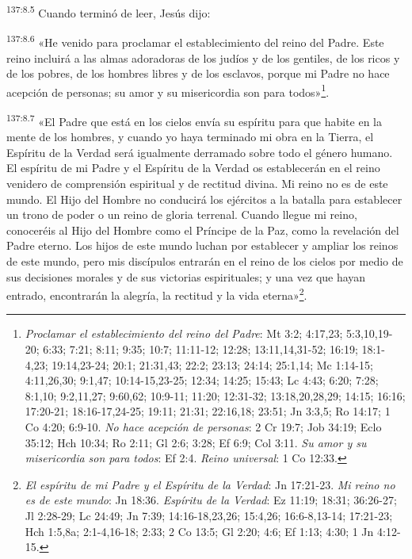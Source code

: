 \par
\textsuperscript{137:8.5} Cuando terminó de leer, Jesús dijo:

\par
\textsuperscript{137:8.6} «He venido para proclamar el establecimiento del reino del Padre. Este reino incluirá a las almas adoradoras de los judíos y de los gentiles, de los ricos y de los pobres, de los hombres libres y de los esclavos, porque mi Padre no hace acepción de personas; su amor y su misericordia son para todos»\footnote{\textit{Proclamar el establecimiento del reino del Padre}: Mt 3:2; 4:17,23; 5:3,10,19-20; 6:33; 7:21; 8:11; 9:35; 10:7; 11:11-12; 12:28; 13:11,14,31-52; 16:19; 18:1-4,23; 19:14,23-24; 20:1; 21:31,43; 22:2; 23:13; 24:14; 25:1,14; Mc 1:14-15; 4:11,26,30; 9:1,47; 10:14-15,23-25; 12:34; 14:25; 15:43; Lc 4:43; 6:20; 7:28; 8:1,10; 9:2,11,27; 9:60,62; 10:9-11; 11:20; 12:31-32; 13:18,20,28,29; 14:15; 16:16; 17:20-21; 18:16-17,24-25; 19:11; 21:31; 22:16,18; 23:51; Jn 3:3,5; Ro 14:17; 1 Co 4:20; 6:9-10. \textit{No hace acepción de personas}: 2 Cr 19:7; Job 34:19; Eclo 35:12; Hch 10:34; Ro 2:11; Gl 2:6; 3:28; Ef 6:9; Col 3:11. \textit{Su amor y su misericordia son para todos}: Ef 2:4. \textit{Reino universal}: 1 Co 12:33.}.

\par
\textsuperscript{137:8.7} «El Padre que está en los cielos envía su espíritu para que habite en la mente de los hombres, y cuando yo haya terminado mi obra en la Tierra, el Espíritu de la Verdad será igualmente derramado sobre todo el género humano. El espíritu de mi Padre y el Espíritu de la Verdad os establecerán en el reino venidero de comprensión espiritual y de rectitud divina. Mi reino no es de este mundo. El Hijo del Hombre no conducirá los ejércitos a la batalla para establecer un trono de poder o un reino de gloria terrenal. Cuando llegue mi reino, conoceréis al Hijo del Hombre como el Príncipe de la Paz, como la revelación del Padre eterno. Los hijos de este mundo luchan por establecer y ampliar los reinos de este mundo, pero mis discípulos entrarán en el reino de los cielos por medio de sus decisiones morales y de sus victorias espirituales; y una vez que hayan entrado, encontrarán la alegría, la rectitud y la vida eterna»\footnote{\textit{El espíritu de mi Padre y el Espíritu de la Verdad}: Jn 17:21-23. \textit{Mi reino no es de este mundo}: Jn 18:36. \textit{Espíritu de la Verdad}: Ez 11:19; 18:31; 36:26-27; Jl 2:28-29; Lc 24:49; Jn 7:39; 14:16-18,23,26; 15:4,26; 16:6-8,13-14; 17:21-23; Hch 1:5,8a; 2:1-4,16-18; 2:33; 2 Co 13:5; Gl 2:20; 4:6; Ef 1:13; 4:30; 1 Jn 4:12-15.}.

